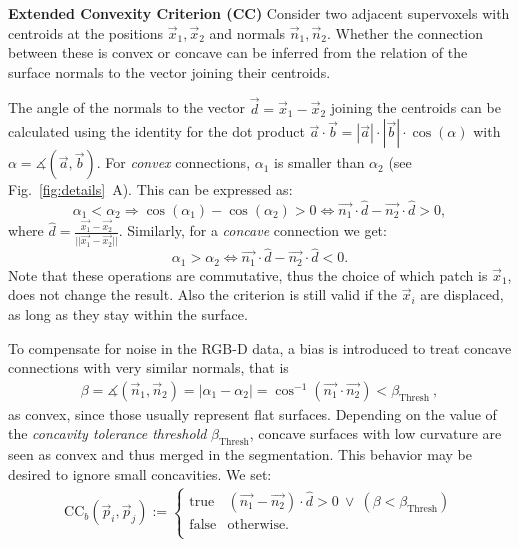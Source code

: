 \textbf{Extended Convexity Criterion (CC)} Consider two adjacent supervoxels with centroids at the positions $\vec x_1,\vec x_2$ and normals $\vec n_1, \vec n_2$. Whether the connection between these is convex or concave can be inferred from the relation of the surface normals to the vector joining their centroids.

The angle of the normals to the vector $\vec d = \vec x_1-\vec x_2$ joining the centroids can be calculated using the identity for the dot product $\vec a\cdot \vec b = |\vec a|\cdot |\vec b|\cdot \cos(\alpha)$ with $\alpha = \measuredangle(\vec a,\vec b)$. For \textit{convex} connections, $\alpha_1$ is smaller than $\alpha_2$ (see Fig.~\ref{fig:details}~A). This can be expressed as:
  \begin{equation*}
    \alpha_1 < \alpha_2 \Rightarrow \cos(\alpha_1) - \cos(\alpha_2) > 0 \Leftrightarrow \vec {n_1}\cdot \hat d - \vec {n_2}\cdot \hat d > 0,
  \end{equation*}
where $\hat d = \frac{\vec{x_1}-\vec{x_2}}{||\vec{x_1}-\vec{x_2}||}$. Similarly, for a \textit{concave} connection we get:
  \begin{equation*}
    \alpha_1 > \alpha_2 \Leftrightarrow \vec {n_1}\cdot \hat d - \vec {n_2}\cdot \hat d < 0.
  \end{equation*}
Note that these operations are commutative, thus the choice of which patch is $\vec x_1$, does not change the result. Also the criterion is still valid if the $\vec x_i$ are displaced, as long as they stay within the surface.

To compensate for noise in the RGB-D data, a bias is introduced to treat concave connections with very similar normals, that is
\begin{align*}
  \beta = \measuredangle(\vec n_1,\vec n_2) = |\alpha_1-\alpha_2| = \cos^{-1}(\vec{n_1}\cdot \vec{n_2}) < \beta_\text{Thresh}~,
\end{align*}
as convex, since those usually represent flat surfaces. Depending on the value of the \textit{concavity tolerance threshold} $\beta_\text{Thresh}$, concave surfaces with low curvature are seen as convex and thus merged in the segmentation. This behavior may be desired to ignore small concavities. We set:
\begin{align}
  \text{CC}_b(\vec p_i, \vec p_j) :=
  \left\{\begin{array}{lc}
          \text{true} & \left(\vec {n_1} - \vec {n_2} \right) \cdot \hat d  > 0~ \lor~ (  \beta < \beta_\text{Thresh} )\\
            \text{false} & \text{otherwise.}\\
          \end{array} \right.
  \label{eqn:CC}
\end{align}

